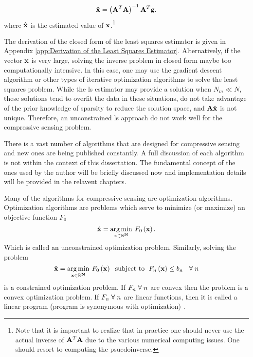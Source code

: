 \begin{equation}
	\hat{ \mathbf{x} } = \left( \mathbf{A}^T \mathbf{A} \right)^{-1} \mathbf{A}^T \mathbf{g}.
\end{equation}
where $\hat{ \mathbf{x} }$ is the estimated value of $\mathbf{x}$.\footnote{Note that it is important to realize that in practice one should never use the actual inverse of $\mathbf{A}^T \mathbf{A}$ due to the various numerical computing issues. One should resort to computing the psuedoinverse.}

The derivation of the closed form of the least squares estimator is given in Appendix \ref{app:Derivation of the Least Squares Estimator}. Alternatively, if the vector $\mathbf{x}$ is very large, solving the inverse problem in closed form maybe too computationally intensive. In this case, one may use the gradient descent algorithm or other types of iterative optimization algorithms to solve the least squares problem. While the \gls{ls} estimator may provide a solution when $N_m \ll N$, these solutions tend to overfit the data in these situations, do not take advantage of the prior knowledge of sparsity to reduce the solution space, and $\mathbf{A}\hat{ \mathbf{x} }$ is not unique. Therefore, an unconstrained \gls{ls} approach do not work well for the compressive sensing problem.

There is a vast number of algorithms that are designed for compressive sensing and new ones are being published constantly. A full discussion of each algorithm is not within the context of this dissertation. The fundamental concept of the ones used by the author will be briefly discussed now and implementation details will be provided in the relavent chapters. 

Many of the algorithms for compressive sensing are optimization algorithms. Optimization algorithms are problems which serve to minimize (or maximize) an objective function $F_0$
%
\begin{equation}
	\hat{ \mathbf{x} } = \operatorname*{arg\,min}_{\mathbf{x \in \mathbb{R}^N }} \: F_0 \left( \mathbf{x} \right).
\end{equation}
%
Which is called an unconstrained optimization problem. Similarly, solving the problem
%
\begin{equation}
	\hat{ \mathbf{x} } = \operatorname*{arg\,min}_{\mathbf{x \in \mathbb{R}^N }} \: F_0 \left( \mathbf{x} \right) \text{\; subject to \;} F_n \left( \mathbf{x} \right) \leq b_n \text{\; \;}\forall \text{\;} n
\end{equation}
%
is a constrained optimization problem. If $F_n \text{\;}\forall \text{\;} n$ are convex then the problem is a convex optimization problem. If  $F_n \text{\;}\forall \text{\;}n$ are linear functions, then it is called a linear program (program is synonymous with optimization) \cite{foucart2013mathematical}.

